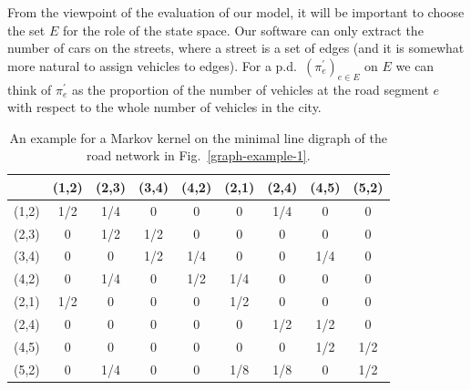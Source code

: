 \documentclass[b5paper,12pt]{report}
\theoremstyle{definition}
\newcommand{\bpi}{\boldsymbol{\pi}}
\begin{document}
From the viewpoint of the evaluation of our model, it will be important to choose the set $E$ for the role of the state space. Our software can only extract the number of cars on the streets, where a street is a set of edges (and it is somewhat more natural to assign vehicles to edges). For a p.d.~$(\pi^\prime_e)_{e\in E}$ on $E$ we can think of $\pi^\prime_e$ as the proportion of the number of vehicles at the road segment $e$ with respect to the whole number of vehicles in the city.

\begin{table}[t!]
\center
\caption{An example for a Markov kernel on the minimal line digraph of the road network in Fig.~\ref{graph-example-1}.}
\begin{tabular}{c|cccccccc}
&(1,2)&(2,3)&(3,4)&(4,2)&(2,1) &(2,4)&(4,5)&(5,2)\\ \hline 
(1,2)&1/2&1/4&0&0&0 &1/4&0&0\\ (2,3)&0&1/2&1/2&0&0 &0&0&0\\                 (3,4)&0&0&1/2&1/4&0 &0&1/4&0\\              (4,2)&0&1/4&0&1/2&1/4 &0&0&0\\ (2,1)&1/2&0&0&0&1/2 &0&0&0 \\                (2,4)&0&0&0&0&0&1/2&1/2&0\\                 (4,5)&0&0&0&0&0&0&1/2&1/2 \\(5,2)&0&1/4&0&0&1/8&1/8&0&1/2
\end{tabular}
\label{markov-kernel-r}
\end{table}

\end{document}
